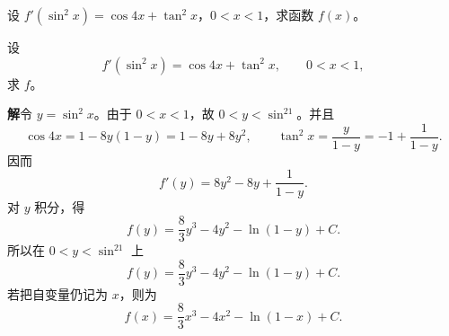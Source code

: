 \begin{xreferenceproblem}[1]
设 $f'(\sin^2x)=\cos4x+\tan^2x$，$0<x<1$，求函数 $f(x)$。
\end{xreferenceproblem}
\begin{xsolution}
设
  \[
    f'(\sin^2x)=\cos4x+\tan^2x,
    \qquad 0<x<1,
  \]
  求 $f$。

  \textbf{解}\quad 令 $y=\sin^2x$。由于 $0<x<1$，故 $0<y<\sin^21$。并且
  \[
    \cos4x=1-8y(1-y)=1-8y+8y^2,
    \qquad
    \tan^2x=\frac{y}{1-y}=-1+\frac1{1-y}.
  \]
  因而
  \[
    f'(y)=8y^2-8y+\frac1{1-y}.
  \]
  对 $y$ 积分，得
  \[
    f(y)=\frac83y^3-4y^2-\ln(1-y)+C.
  \]
  所以在 $0<y<\sin^21$ 上
  \[
    \boxed{f(y)=\frac83y^3-4y^2-\ln(1-y)+C}.
  \]
  若把自变量仍记为 $x$，则为
  \[
    \boxed{f(x)=\frac83x^3-4x^2-\ln(1-x)+C}.
  \]
\end{xsolution}


